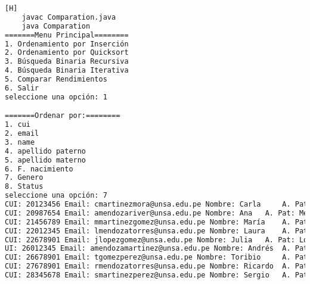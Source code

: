         \begin{lstlisting}[language=bash,caption={Compilación y ejecución del código}][H]
    javac Comparation.java
    java Comparation
=======Menu Principal========
1. Ordenamiento por Inserción
2. Ordenamiento por Quicksort
3. Búsqueda Binaria Recursiva
4. Búsqueda Binaria Iterativa
5. Comparar Rendimientos
6. Salir
seleccione una opción: 1

=======Ordenar por:========
1. cui
2. email
3. name
4. apellido paterno
5. apellido materno
6. F. nacimiento
7. Genero
8. Status
seleccione una opción: 7
CUI: 20123456 Email: cmartinezmora@unsa.edu.pe Nombre: Carla	 A. Pat: Martinez A. Mat: Mora Fecha de Nacimiento: 1998-04-12 Genero: 0 Estado: 1
CUI: 20987654 Email: amendozariver@unsa.edu.pe Nombre: Ana	 A. Pat: Mendoza A. Mat: Rivera Fecha de Nacimiento: 1997-03-25 Genero: 0 Estado: 1
CUI: 21456789 Email: mmartinezgomez@unsa.edu.pe Nombre: María	 A. Pat: Martinez A. Mat: Gomez Fecha de Nacimiento: 1994-12-03 Genero: 0 Estado: 1
CUI: 22012345 Email: lmendozatorres@unsa.edu.pe Nombre: Laura	 A. Pat: Mendoza A. Mat: Torres Fecha de Nacimiento: 1996-05-18 Genero: 0 Estado: 1
CUI: 22678901 Email: jlopezgomez@unsa.edu.pe Nombre: Julia	 A. Pat: Lopez A. Mat: Gomez Fecha de Nacimiento: 1990-03-07 Genero: 0 Estado: 0
UI: 26012345 Email: amendozamartinez@unsa.edu.pe Nombre: Andrés	 A. Pat: Mendoza A. Mat: Martinez Fecha de Nacimiento: 1989-11-08 Genero: 1 Estado: 1
CUI: 26678901 Email: tgomezperez@unsa.edu.pe Nombre: Toribio	 A. Pat: Gomez A. Mat: Perez Fecha de Nacimiento: 1995-10-15 Genero: 1 Estado: 1
CUI: 27678901 Email: rmendozatorres@unsa.edu.pe Nombre: Ricardo	 A. Pat: Mendoza A. Mat: Torres Fecha de Nacimiento: 1988-08-03 Genero: 1 Estado: 1
CUI: 28345678 Email: smartinezperez@unsa.edu.pe Nombre: Sergio	 A. Pat: Martinez A. Mat: Perez Fecha de Nacimiento: 1999-10-09 Genero: 1 Estado: 1

  \end{lstlisting}
